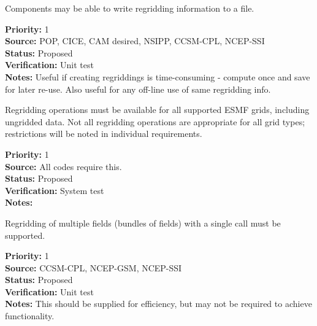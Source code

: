 
Components may be able to write regridding information to a file.

\begin{reqlist}
{\bf Priority:} 1 \\
{\bf Source:} POP, CICE, CAM desired, NSIPP, CCSM-CPL, NCEP-SSI \\
{\bf Status:} Proposed \\
{\bf Verification:} Unit test \\
{\bf Notes:} Useful if creating regriddings is time-consuming - compute once
             and save for later re-use.  Also useful for any off-line
             use of same regridding info.
\end{reqlist}


Regridding operations must be available for all supported ESMF grids,
including ungridded data.  Not all regridding operations are appropriate for
all grid types; restrictions will be noted in individual requirements.

\begin{reqlist}
{\bf Priority:} 1 \\
{\bf Source:} All codes require this. \\
{\bf Status:} Proposed \\
{\bf Verification:} System test \\
{\bf Notes:} 
\end{reqlist}


Regridding of multiple fields (bundles of fields) with
a single call must be supported.

\begin{reqlist}
{\bf Priority:} 1  \\
{\bf Source:} CCSM-CPL, NCEP-GSM, NCEP-SSI \\
{\bf Status:} Proposed \\
{\bf Verification:} Unit test \\
{\bf Notes:} This should be supplied for efficiency, but may not
             be required to achieve functionality.
\end{reqlist}


